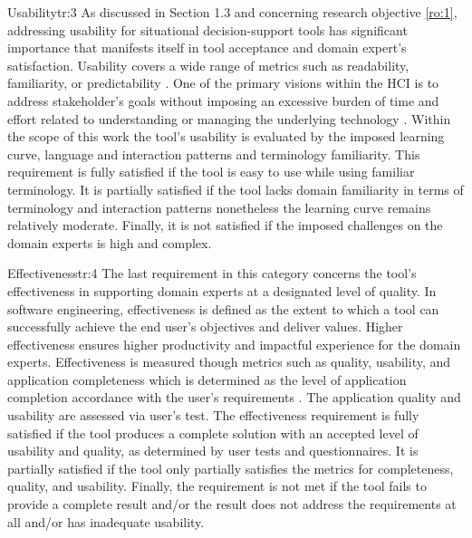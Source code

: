 \begin{thesistoolrequirement}{Usability}{tr:3}
As discussed in Section 1.3 and concerning research objective \cref{ro:1}, addressing usability for situational decision-support tools has significant importance that manifests itself in tool acceptance and domain expert’s satisfaction. Usability covers a wide range of metrics such as readability, familiarity, or predictability  \autocite{Insfran2012}. One of the primary visions within the HCI is to address stakeholder’s goals without imposing an excessive burden of time and effort related to understanding or managing the underlying technology  \autocite{Ponce2022}.
Within the scope of this work the tool’s usability is evaluated by the imposed learning curve, language and interaction patterns and terminology familiarity.
This requirement is fully satisfied if the tool is easy to use while using familiar terminology. It is partially satisfied if the tool lacks domain familiarity in terms of terminology and interaction patterns nonetheless the learning curve remains relatively moderate. Finally, it is not satisfied if the imposed challenges on the domain experts is high and complex.

\end{thesistoolrequirement}

\begin{thesistoolrequirement}{Effectiveness}{tr:4}
The last requirement in this category concerns the tool's effectiveness in supporting domain experts at a designated level of quality. In software engineering, effectiveness is defined as the extent to which a tool can successfully achieve the end user’s objectives and deliver values. Higher effectiveness ensures higher productivity and impactful experience for the domain experts. Effectiveness is measured though metrics such as quality, usability, and application completeness which is determined as the level of application completion accordance with the user's requirements \autocite{Semiawan2021}. The application quality and usability are assessed via user’s test.
The effectiveness requirement is fully satisfied if the tool produces a complete solution with an accepted level of usability and quality, as determined by user tests and questionnaires. It is partially satisfied if the tool only partially satisfies the metrics for completeness, quality, and usability. Finally, the requirement is not met if the tool fails to provide a complete result and/or the result does not address the requirements at all and/or has inadequate usability.

\end{thesistoolrequirement}

